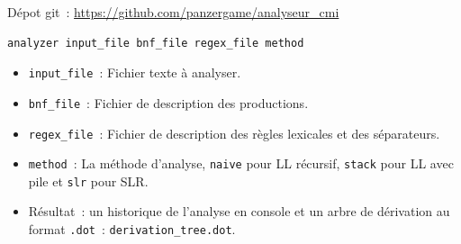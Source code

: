 \documentclass{beamer}
\begin{document}
\begin{frame}[fragile]
	Dépot git~: \url{https://github.com/panzergame/analyseur_cmi}

	\begin{verbatim}
analyzer input_file bnf_file regex_file method
	\end{verbatim}

	\begin{itemize}
		\item \texttt{input\_file}~: Fichier texte à analyser.
		\item \texttt{bnf\_file}~: Fichier de description des productions.
		\item \texttt{regex\_file}~: Fichier de description des règles lexicales et des séparateurs.
		\item \texttt{method}~: La méthode d'analyse, \texttt{naive} pour LL récursif, \texttt{stack} pour LL avec pile et \texttt{slr} pour SLR.
		\item Résultat~: un historique de l'analyse en console et un arbre de dérivation au format \texttt{.dot}~: \texttt{derivation\_tree.dot}.
	\end{itemize}

\end{frame}
\end{document}
